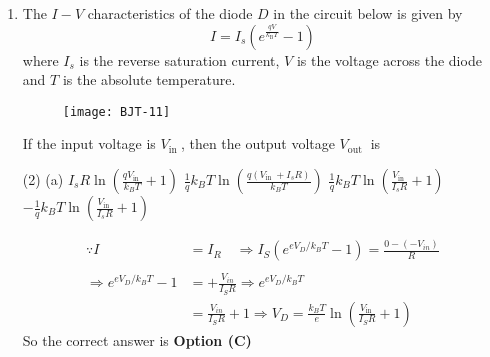 \begin{enumerate}
\begin{answer}
\begin{align*}
&=\frac{100 \Omega \times 2 M \Omega}{100 \Omega+2 M \Omega} \approx 100 \Omega\\
\text{So }V_{A}&=\frac{100}{360} \times 12 V=\frac{10}{3} V
\intertext{\textbf{Case B:} Voltmeter internal resistance is $0.1 \mathrm{k} \Omega=100 \Omega$, so equivalent resistance across ac is}
&=\frac{100 \Omega \times 100 \Omega}{100 \Omega+100 \Omega}=50 \Omega\\
\text{So }V_{B}&=\frac{50}{310} \times 12 V=\frac{600}{310} V=\frac{60}{31} V\\
\Rightarrow \frac{V_{A}}{V_{B}}&=\frac{10 / 3}{60 / 31}=\frac{10}{60} \times \frac{31}{3}=1.72
\end{align*}
So the correct answer is \textbf{Option (B)}
\end{answer}
\item The $I-V$ characteristics of the diode $D$ in the circuit below is given by
$$
I=I_{s}\left(e^{\frac{q V}{k_{\mathrm{B}} T}}-1\right)
$$
where $I_{s}$ is the reverse saturation current, $V$ is the voltage across the diode and $T$ is the absolute temperature.\\
\begin{figure}[H]
	\centering
	\texttt{[image: BJT-11]}
\end{figure}
If the input voltage is $V_{\text {in }}$, then the output voltage $V_{\text {out }}$ is
{}
\begin{tasks}(2)
\task[\textbf{A.}] (a) $I_{s} R \ln \left(\frac{q V_{\text {in }}}{k_{B} T}+1\right)$
\task[\textbf{B.}] $\frac{1}{q} k_{B} T \ln \left(\frac{q\left(V_{\text {in }}+I_{s} R\right)}{k_{B} T}\right)$
\task[\textbf{C.}]  $\frac{1}{q} k_{B} T \ln \left(\frac{V_{\text {in }}}{I_{s} R}+1\right)$
\task[\textbf{D.}]  $-\frac{1}{q} k_{B} T \ln \left(\frac{V_{\text {in }}}{I_{s} R}+1\right)$
\end{tasks}
\begin{answer}
\begin{align*}
\because I&=I_{R} \quad \Rightarrow I_{S}\left(e^{e V_{D} / k_{B} T}-1\right)=\frac{0-\left(-V_{i n}\right)}{R}\\
\\\Rightarrow e^{e V_{D} / k_{B} T}-1&=+\frac{V_{i n}}{I_{S} R} \Rightarrow e^{e V_{D} / k_{B} T}\\&=\frac{V_{i n}}{I_{S} R}+1 \Rightarrow V_{D}=\frac{k_{B} T}{e} \ln \left(\frac{V_{\text {in }}}{I_{S} R}+1\right)
\end{align*}
So the correct answer is \textbf{Option (C)}
\end{answer}




\end{enumerate}